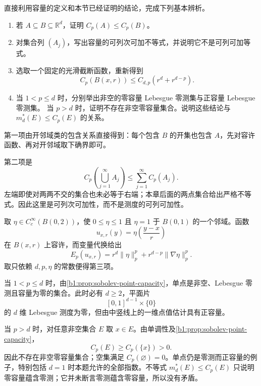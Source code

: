 \begin{exercise}\label{b1:ex:26-basic-capacity-properties}
直接利用容量的定义和本节已经证明的结论，完成下列基本辨析。
\begin{enumerate}
 \item 若 \(A\subseteq B\subseteq\mathbb R^d\)，证明 \(C_p(A)\le C_p(B)\)。
 \item 对集合列 \((A_j)\)，写出容量的可列次可加不等式，并说明它不是可列可加等式。
 \item 选取一个固定的光滑截断函数，重新得到
 \[
  C_p(B(x,r))\le C_{d,p}(r^d+r^{d-p}).
 \]
 \item 当 \(1<p\le d\) 时，分别举出非空的零容量 Lebesgue 零测集与正容量 Lebesgue 零测集。
 当 \(p>d\) 时，证明不存在非空零容量集合。说明这些结论与 \(m_d^*(E)\le C_p(E)\) 的关系。
\end{enumerate}
\end{exercise}
\begin{solution}
第一项由开邻域类的包含关系直接得到：每个包含 \(B\) 的开集也包含 \(A\)，先对容许函数、再对开邻域取下确界即可。

第二项是
\[
 C_p\left(\bigcup_{j=1}^{\infty}A_j\right)
 \le\sum_{j=1}^{\infty}C_p(A_j).
\]
左端即使对两两不交的集合也未必等于右端；本章后面的两点集合给出严格不等式。因此这里是可列次可加性，而不是测度的可列可加性。

取 \(\eta\in C_c^\infty(B(0,2))\)，使 \(0\le\eta\le1\) 且 \(\eta=1\) 于 \(B(0,1)\) 的一个邻域。函数
\[
 u_{x,r}(y)=\eta\left(\frac{y-x}{r}\right)
\]
在 \(B(x,r)\) 上容许，而变量代换给出
\[
 E_p(u_{x,r})
 =r^d\|\eta\|_p^p+r^{d-p}\|\nabla\eta\|_p^p.
\]
取只依赖 \(d,p,\eta\) 的常数便得第三项。

当 \(1<p\le d\) 时，由\cref{b1:prop:sobolev-point-capacity}，单点是非空、Lebesgue 零测且容量为零的集合。此时必有 \(d\ge2\)，平面片
\[
 [0,1]^{d-1}\times\{0\}
\]
的 \(d\) 维 Lebesgue 测度为零，但由中竖线上的一维点值估计具有正容量。

当 \(p>d\) 时，对任意非空集合 \(E\) 取 \(x\in E\)。由单调性及\cref{b1:prop:sobolev-point-capacity}，
\[
 C_p(E)\ge C_p(\{x\})>0.
\]
因此不存在非空零容量集合；空集满足 \(C_p(\varnothing)=0\)。单点仍是零测而正容量的例子，特别包括 \(d=1\) 时本题允许的全部指数。不等式 \(m_d^*(E)\le C_p(E)\) 只说明零容量蕴含零测；它并未断言零测蕴含零容量，所以没有矛盾。
\end{solution}

